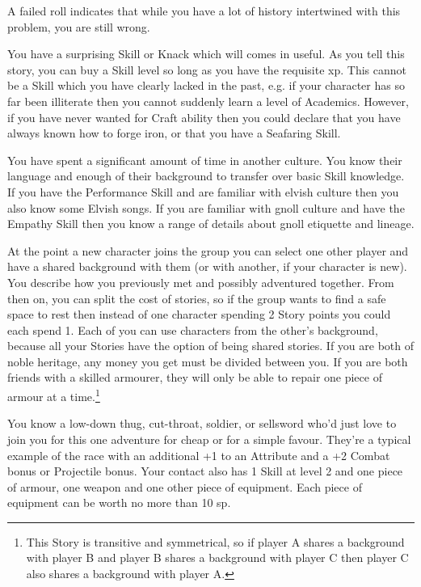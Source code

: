 \begin{multicols}{2}
A failed roll indicates that while you have a lot of history intertwined with this problem, you are still wrong.

You have a surprising Skill or Knack which will comes in useful. As you tell this story, you can buy a Skill level so long as you have the requisite \gls{xp}. This cannot be a Skill which you have clearly lacked in the past, e.g. if your character has so far been illiterate then you cannot suddenly learn a level of Academics. However, if you have never wanted for Craft ability then you could declare that you have always known how to forge iron, or that you have a Seafaring Skill.

You have spent a significant amount of time in another culture. You know their language and enough of their background to transfer over basic Skill knowledge. If you have the Performance Skill and are familiar with elvish culture then you also know some Elvish songs. If you are familiar with gnoll culture and have the Empathy Skill then you know a range of details about gnoll etiquette and lineage.

At the point a new character joins the group you can select one other player and have a shared background with them (or with another, if your character is new). You describe how you previously met and possibly adventured together. From then on, you can split the cost of stories, so if the group wants to find a safe space to rest then instead of one character spending 2 Story points you could each spend 1. Each of you can use characters from the other's background, because all your Stories have the option of being shared stories. If you are both of noble heritage, any money you get must be divided between you. If you are both friends with a skilled armourer, they will only be able to repair one piece of armour at a time.\footnote{This Story is transitive and symmetrical, so if player A shares a background with player B and player B shares a background with player C then player C also shares a background with player A.}

You know a low-down thug, cut-throat, soldier, or sellsword who'd just love to join you for this one adventure for cheap or for a simple favour. They're a typical example of the race with an additional +1 to an Attribute and a +2 Combat bonus or Projectile bonus. Your contact also has 1 Skill at level 2 and one piece of armour, one weapon and one other piece of equipment. Each piece of equipment can be worth no more than 10 \gls{sp}.


\end{multicols}
